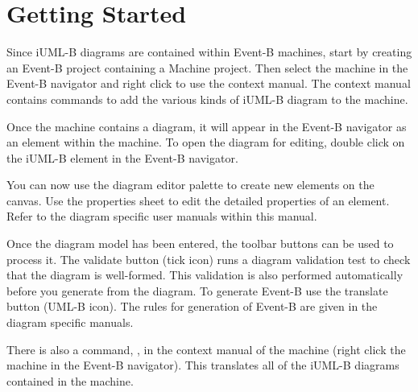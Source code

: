 \section{Getting Started}
\label{sec:iumlb-gettingstarted}

Since iUML-B diagrams are contained within Event-B machines, start by creating an Event-B project containing a Machine project. 
Then select the machine in the Event-B navigator and right click to use the context manual. 
The context manual contains commands to add the various kinds of iUML-B diagram to the machine.

Once the machine contains a diagram, it will appear in the Event-B navigator as an element within the machine.
To open the diagram for editing, double click on the iUML-B element in the Event-B navigator.

You can now use the diagram editor palette to create new elements on the canvas. 
Use the properties sheet to edit the detailed properties of an element.
Refer to the diagram specific user manuals within this manual.

Once the diagram model has been entered, the toolbar buttons can be used to process it.
The validate button (tick icon) runs a diagram validation test to check that the diagram is well-formed.
This validation is also performed automatically before you generate from the diagram.
To generate Event-B use the translate button (UML-B icon). 
The rules for generation of Event-B are given in the diagram specific manuals.

There is also a command, , in the context manual of the machine (right click the machine in the Event-B navigator).
This translates all of the iUML-B diagrams contained in the machine.

